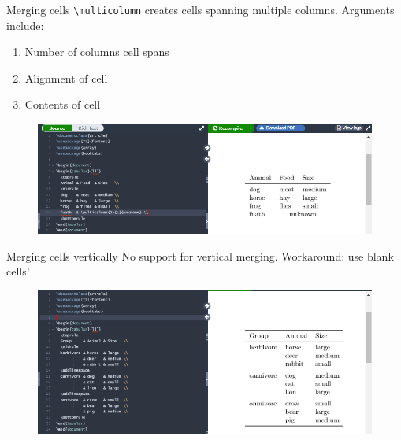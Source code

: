 \documentclass{beamer}
\begin{document}
{  \begin{frame}{Merging cells}
    \texttt{\textbackslash multicolumn} creates cells spanning multiple columns. Arguments include:
    \begin{enumerate}
      \item Number of columns cell spans
      \item Alignment of cell
      \item Contents of cell
    \end{enumerate}
    \begin{figure}
      \includegraphics[width=0.9\linewidth]{day01-overleaf-11H-table-merge.png}
    \end{figure}
  \end{frame}

  \begin{frame}{Merging cells vertically}
    No support for vertical merging. Workaround: use blank cells!
    \begin{figure}
      \includegraphics[width=0.9\linewidth]{day01-overleaf-11I-table-vertmerge.png}
    \end{figure}
  \end{frame}

}
\end{document}
